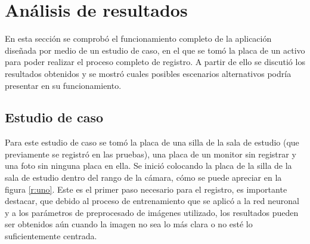 \chapter{Análisis de resultados}
\label{C:sobre_LaTeX}
En esta sección se comprobó el funcionamiento completo de la aplicación diseñada por medio de un estudio de caso, en el que se tomó la placa de un activo para poder realizar el proceso completo de registro. A partir de ello se discutió los resultados obtenidos y se mostró cuales posibles escenarios alternativos podría presentar en su funcionamiento.
\par

\section{Estudio de caso}
Para este estudio de caso se tomó la placa de una silla de la sala de estudio (que previamente se registró en las pruebas), una placa de un monitor sin registrar y una foto sin ninguna placa en ella. Se inició colocando la placa de la silla de la sala de estudio dentro del rango de la cámara, cómo se puede apreciar en la figura \ref{r:uno}. Este es el primer paso necesario para el registro, es importante destacar, que debido al proceso de entrenamiento que se aplicó a la red neuronal y a los parámetros de preprocesado de imágenes utilizado, los resultados pueden ser obtenidos aún cuando la imagen no sea lo más clara o no esté lo suficientemente centrada. 

